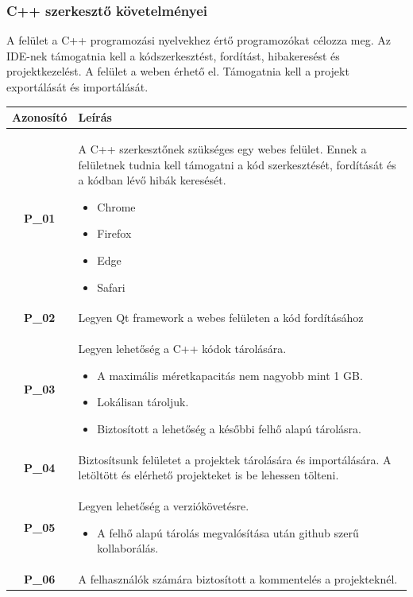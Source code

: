 \documentclass{article}
\begin{document}
\subsubsection{C++ szerkesztő követelményei}

A felület a C++ programozási nyelvekhez értő programozókat célozza meg. Az IDE-nek támogatnia kell a kódszerkesztést, fordítást, hibakeresést és projektkezelést. A felület a weben érhető el. Támogatnia kell a projekt exportálását és importálását.

\begingroup
\centering
\begin{longtable}{|c|p{14cm}|}
\hline
\textbf{Azonosító} & \textbf{Leírás}        \\ 
\hline
       \textbf{P\_01}  &  A C++ szerkesztőnek szükséges egy webes felület. Ennek a felületnek tudnia kell támogatni a kód szerkesztését, fordítását és a kódban lévő hibák keresését.
       \begin{itemize}
        \item Chrome
        \item Firefox
        \item Edge
        \item Safari
        \end{itemize} \\\hline
       \textbf{P\_02}  &  Legyen Qt framework a webes felületen a kód fordításához \\\hline
       \textbf{P\_03}  &  Legyen lehetőség a C++ kódok tárolására.
       \begin{itemize}
        \item A maximális méretkapacitás nem nagyobb mint 1 GB.
        \item Lokálisan tároljuk.
        \item Biztosított a lehetőség a későbbi felhő alapú tárolásra.
        \end{itemize} \\\hline
       \textbf{P\_04}  &  Biztosítsunk felületet a projektek tárolására és importálására. A letöltött és elérhető projekteket is be lehessen tölteni. \\\hline
       \textbf{P\_05}  &  Legyen lehetőség a verziókövetésre. 
       \begin{itemize}
        \item A felhő alapú tárolás megvalósítása után github szerű kollaborálás.
        \end{itemize} \\\hline
       \textbf{P\_06}  &  A felhasználók számára biztosított a kommentelés a projekteknél.\\\hline

\end{longtable}
\end{document}
